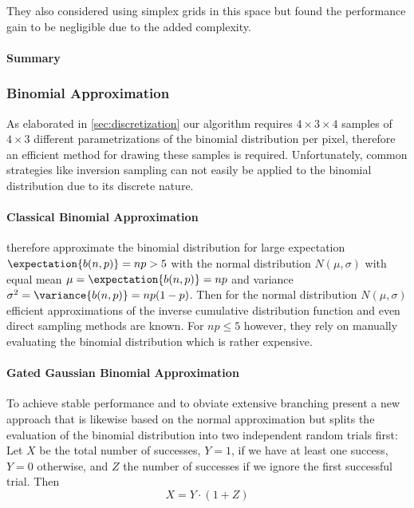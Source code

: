 They also considered using simplex grids in this space but found the performance gain to be negligible due to the added complexity.


\paragraph{Summary}
%



\subsubsection{Binomial Approximation}
\label{sec:approximation}

As elaborated in \cref{sec:discretization} our algorithm requires $4\times3\times4$ samples of $4\times3$ different parametrizations of the binomial distribution per pixel, therefore an efficient method for drawing these samples is required.
%
Unfortunately, common strategies like inversion sampling can not easily be applied to the binomial distribution due to its discrete nature.


\paragraph{Classical Binomial Approximation}
%
\textcite{zirr2016} therefore approximate the binomial distribution for large expectation $\expectation{b(n,p)}=np>5$ with the normal distribution $N(\mu,\sigma)$ with equal mean $\mu=\expectation{b(n,p)}=np$ and variance $\sigma^2=\variance{b(n,p)}=np(1-p)$.
%
Then for the normal distribution $N(\mu,\sigma)$ efficient approximations of the inverse cumulative distribution function \parencite[e.g.,][]{giles2012} and even direct sampling methods \parencite[e.g.,][]{box1958} are known.
%
For $np \le 5$ however, they rely on manually evaluating the binomial distribution which is rather expensive.


\paragraph{Gated Gaussian Binomial Approximation}
%
To achieve stable performance and to obviate extensive branching \textcite{deliot2023} present a new approach that is likewise based on the normal approximation but splits the evaluation of the binomial distribution into two independent random trials first:
%
Let $X$ be the total number of successes, $Y=1$, if we have at least one success, $Y=0$ otherwise, and $Z$ the number of successes if we ignore the first successful trial. Then
%
\begin{equation}
    X = Y \cdot (1 + Z)
\end{equation}


